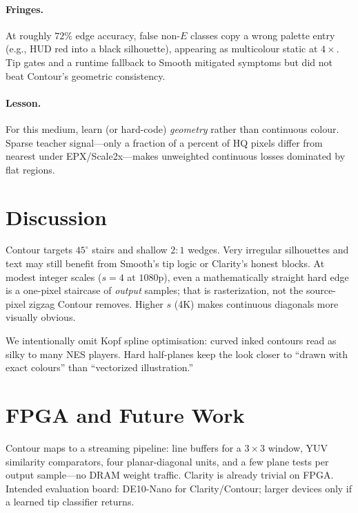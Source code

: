\documentclass[conference]{IEEEtran}
\begin{document}
\paragraph{Fringes.}
At roughly $72\%$ edge accuracy, false non-$E$ classes copy a wrong palette
entry (e.g., HUD red into a black silhouette), appearing as multicolour static
at $4{\times}$. Tip gates and a runtime fallback to Smooth mitigated symptoms
but did not beat Contour's geometric consistency.

\paragraph{Lesson.}
For this medium, learn (or hard-code) \emph{geometry} rather than continuous
colour. Sparse teacher signal---only a fraction of a percent of HQ pixels
differ from nearest under EPX/Scale2x---makes unweighted continuous losses
dominated by flat regions.

\section{Discussion}
\label{sec:discuss}

Contour targets $45^\circ$ stairs and shallow $2{:}1$ wedges. Very irregular
silhouettes and text may still benefit from Smooth's tip logic or Clarity's
honest blocks. At modest integer scales ($s{=}4$ at $1080$p), even a
mathematically straight hard edge is a one-pixel staircase of \emph{output}
samples; that is rasterization, not the source-pixel zigzag Contour removes.
Higher $s$ (4K) makes continuous diagonals more visually obvious.

We intentionally omit Kopf spline optimisation: curved inked contours read as
silky to many NES players. Hard half-planes keep the look closer to ``drawn
with exact colours'' than ``vectorized illustration.''

\section{FPGA and Future Work}
\label{sec:fpga}

Contour maps to a streaming pipeline: line buffers for a $3{\times}3$ window,
YUV similarity comparators, four planar-diagonal units, and a few plane tests
per output sample---no DRAM weight traffic. Clarity is already trivial on
FPGA. Intended evaluation board: DE10-Nano for Clarity/Contour; larger devices
only if a learned tip classifier returns.
\end{document}

